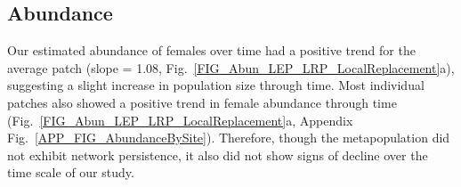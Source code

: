 \documentclass[12pt, oneside]{article}   	%
\begin{document}

\subsection*{Abundance}

Our estimated abundance of females over time had a positive trend for the average patch (slope = 1.08, Fig.\ \ref{FIG_Abun_LEP_LRP_LocalReplacement}a), suggesting a slight increase in population size through time. Most individual patches also showed a positive trend in female abundance through time (Fig.\ \ref{FIG_Abun_LEP_LRP_LocalReplacement}a, Appendix Fig.\ \ref{APP_FIG_AbundanceBySite}). Therefore, though the metapopulation did not exhibit network persistence, it also did not show signs of decline over the time scale of our study. 


\end{document}
